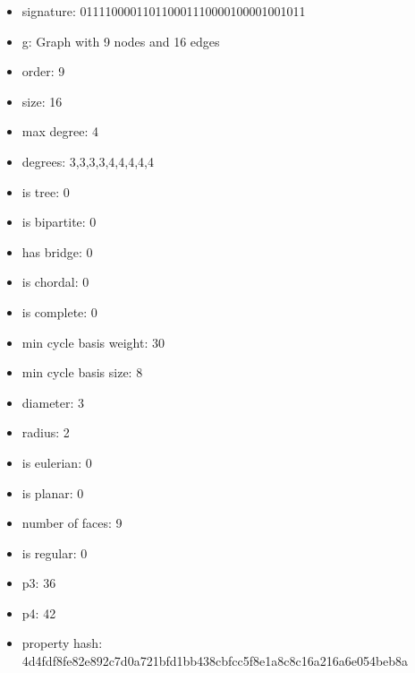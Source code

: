 \newpage
\begin{figure}
\end{figure}
\begin{itemize}
\item signature: 011110000110110001110000100001001011
\item g: Graph with 9 nodes and 16 edges
\item order: 9
\item size: 16
\item max degree: 4
\item degrees: 3,3,3,3,4,4,4,4,4
\item is tree: 0
\item is bipartite: 0
\item has bridge: 0
\item is chordal: 0
\item is complete: 0
\item min cycle basis weight: 30
\item min cycle basis size: 8
\item diameter: 3
\item radius: 2
\item is eulerian: 0
\item is planar: 0
\item number of faces: 9
\item is regular: 0
\item p3: 36
\item p4: 42
\item property hash: 4d4fdf8fe82e892c7d0a721bfd1bb438cbfcc5f8e1a8c8c16a216a6e054beb8a
\end{itemize}
